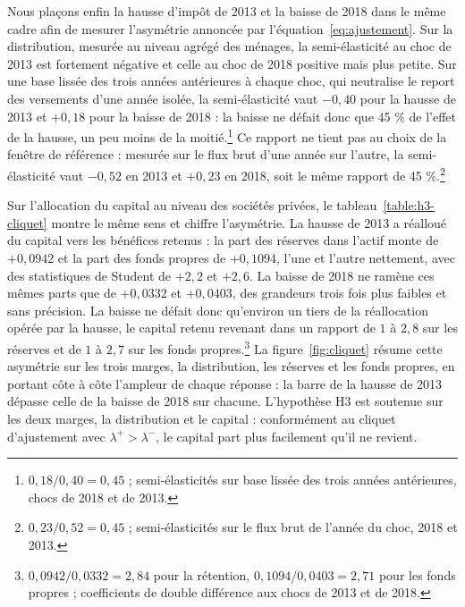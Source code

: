 Nous plaçons enfin la hausse d'impôt de 2013 et la baisse de 2018 dans le même cadre afin de mesurer
l'asymétrie annoncée par l'équation~\eqref{eq:ajustement}. Sur la distribution, mesurée au niveau
agrégé des ménages, la semi-élasticité au choc de 2013 est fortement négative et celle au choc de
2018 positive mais plus petite. Sur une base lissée des trois années antérieures à chaque choc, qui
neutralise le report des versements d'une année isolée, la semi-élasticité vaut $-0{,}40$ pour la
hausse de 2013 et $+0{,}18$ pour la baisse de 2018 : la baisse ne défait donc que 45 \% de l'effet
de la hausse, un peu moins de la moitié.\footnote{$0{,}18 / 0{,}40 = 0{,}45$ ; semi-élasticités sur
base lissée des trois années antérieures, chocs de 2018 et de 2013.} Ce rapport ne tient pas au
choix de la fenêtre de référence : mesurée sur le flux brut d'une année sur l'autre, la
semi-élasticité vaut $-0{,}52$ en 2013 et $+0{,}23$ en 2018, soit le même rapport de 45
\%.\footnote{$0{,}23 / 0{,}52 = 0{,}45$ ; semi-élasticités sur le flux brut de l'année du choc, 2018
et 2013.}

Sur l'allocation du capital au niveau des sociétés privées, le tableau~\ref{table:h3-cliquet} montre
le même sens et chiffre l'asymétrie. La hausse de 2013 a réalloué du capital vers les bénéfices
retenus : la part des réserves dans l'actif monte de $+0{,}0942$ et la part des fonds propres de
$+0{,}1094$, l'une et l'autre nettement, avec des statistiques de Student de $+2{,}2$ et $+2{,}6$. La
baisse de 2018 ne ramène ces mêmes parts que de $+0{,}0332$ et $+0{,}0403$, des grandeurs trois fois
plus faibles et sans précision. La baisse ne défait donc qu'environ un tiers de la réallocation
opérée par la hausse, le capital retenu revenant dans un rapport de $1$ à $2{,}8$ sur les réserves et
de $1$ à $2{,}7$ sur les fonds propres.\footnote{$0{,}0942 / 0{,}0332 = 2{,}84$ pour la rétention,
$0{,}1094 / 0{,}0403 = 2{,}71$ pour les fonds propres ; coefficients de double différence aux chocs
de 2013 et de 2018.} La figure~\ref{fig:cliquet} résume cette asymétrie sur les trois marges, la
distribution, les réserves et les fonds propres, en portant côte à côte l'ampleur de chaque réponse :
la barre de la hausse de 2013 dépasse celle de la baisse de 2018 sur chacune. L'hypothèse H3 est
soutenue sur les deux marges, la distribution et le capital : conformément au cliquet d'ajustement
avec $\lambda^{+} > \lambda^{-}$, le capital part plus facilement qu'il ne revient.



